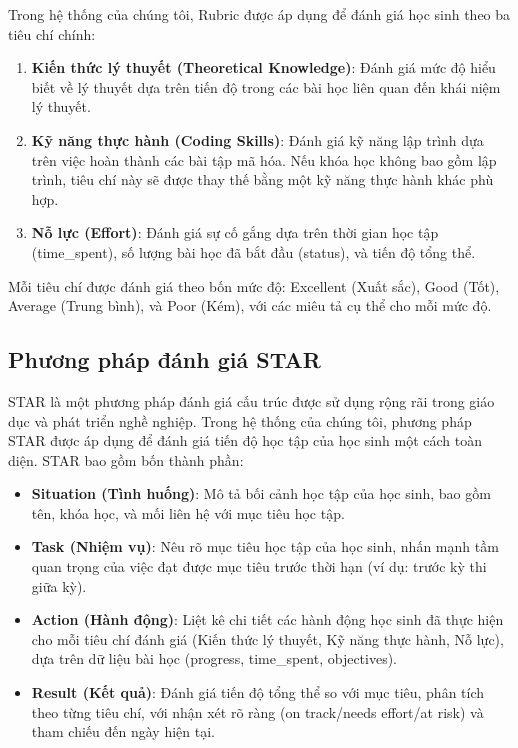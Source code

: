 Trong hệ thống của chúng tôi, Rubric được áp dụng để đánh giá học sinh theo ba tiêu chí chính:
\begin{enumerate}
    \item \textbf{Kiến thức lý thuyết (Theoretical Knowledge)}: Đánh giá mức độ hiểu biết về lý thuyết dựa trên tiến độ trong các bài học liên quan đến khái niệm lý thuyết.
    
    \item \textbf{Kỹ năng thực hành (Coding Skills)}: Đánh giá kỹ năng lập trình dựa trên việc hoàn thành các bài tập mã hóa. Nếu khóa học không bao gồm lập trình, tiêu chí này sẽ được thay thế bằng một kỹ năng thực hành khác phù hợp.
    
    \item \textbf{Nỗ lực (Effort)}: Đánh giá sự cố gắng dựa trên thời gian học tập (time\_spent), số lượng bài học đã bắt đầu (status), và tiến độ tổng thể.
\end{enumerate}

Mỗi tiêu chí được đánh giá theo bốn mức độ: Excellent (Xuất sắc), Good (Tốt), Average (Trung bình), và Poor (Kém), với các miêu tả cụ thể cho mỗi mức độ.

\subsection{Phương pháp đánh giá STAR}
STAR là một phương pháp đánh giá cấu trúc được sử dụng rộng rãi trong giáo dục và phát triển nghề nghiệp. Trong hệ thống của chúng tôi, phương pháp STAR được áp dụng để đánh giá tiến độ học tập của học sinh một cách toàn diện. STAR bao gồm bốn thành phần:

\begin{itemize}
    \item \textbf{Situation (Tình huống)}: Mô tả bối cảnh học tập của học sinh, bao gồm tên, khóa học, và mối liên hệ với mục tiêu học tập.
    
    \item \textbf{Task (Nhiệm vụ)}: Nêu rõ mục tiêu học tập của học sinh, nhấn mạnh tầm quan trọng của việc đạt được mục tiêu trước thời hạn (ví dụ: trước kỳ thi giữa kỳ).
    
    \item \textbf{Action (Hành động)}: Liệt kê chi tiết các hành động học sinh đã thực hiện cho mỗi tiêu chí đánh giá (Kiến thức lý thuyết, Kỹ năng thực hành, Nỗ lực), dựa trên dữ liệu bài học (progress, time\_spent, objectives).
    
    \item \textbf{Result (Kết quả)}: Đánh giá tiến độ tổng thể so với mục tiêu, phân tích theo từng tiêu chí, với nhận xét rõ ràng (on track/needs effort/at risk) và tham chiếu đến ngày hiện tại.
\end{itemize}
